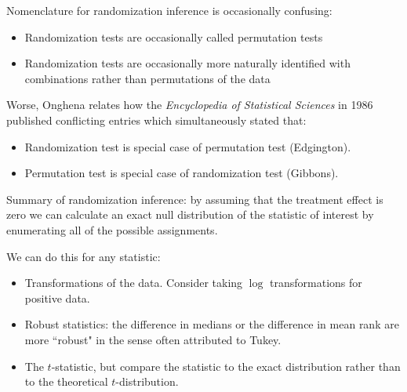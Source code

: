 \documentclass[notes,11pt, aspectratio=169]{beamer}
\begin{document}
\begin{frame}{}

    Nomenclature for randomization inference is occasionally confusing:
    \begin{itemize}
        \item Randomization tests are occasionally called permutation tests
        \item Randomization tests are occasionally more naturally identified
            with combinations rather than permutations of the data
    \end{itemize}
    
    \bigskip 

    Worse, Onghena relates how
    the \textit{Encyclopedia of Statistical Sciences} in 1986
    published conflicting entries which simultaneously stated that:

    \begin{itemize}
        \item Randomization test is special case of permutation test (Edgington).
        \item Permutation test is special case of randomization test (Gibbons).
    \end{itemize}
    
\end{frame}


\begin{frame}{}

    Summary of randomization inference: by assuming that the treatment effect is zero we can calculate
    an exact null distribution of the statistic of interest by enumerating all of the possible assignments.

    \medskip

    We can do this for any statistic:
    \begin{itemize}
        \item Transformations of the data. Consider taking $\log$ transformations for positive data.
        \item Robust statistics: the difference in medians or the difference in mean rank are more ``robust"
        in the sense often attributed to Tukey.
        \item The $t$-statistic, but compare the statistic to the exact distribution
        rather than to the theoretical $t$-distribution.
    \end{itemize}
\end{frame}
\end{document}
